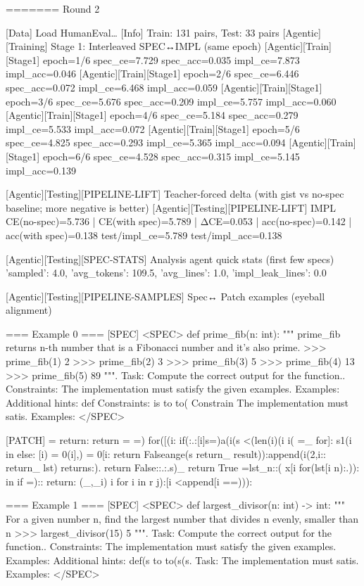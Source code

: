 =======
Round 2

[Data] Load HumanEval…
[Info] Train: 131 pairs, Test: 33 pairs
[Agentic][Training] Stage 1: Interleaved SPEC↔IMPL (same epoch)
[Agentic][Train][Stage1] epoch=1/6 spec_ce=7.729 spec_acc=0.035 impl_ce=7.873 impl_acc=0.046
[Agentic][Train][Stage1] epoch=2/6 spec_ce=6.446 spec_acc=0.072 impl_ce=6.468 impl_acc=0.059
[Agentic][Train][Stage1] epoch=3/6 spec_ce=5.676 spec_acc=0.209 impl_ce=5.757 impl_acc=0.060
[Agentic][Train][Stage1] epoch=4/6 spec_ce=5.184 spec_acc=0.279 impl_ce=5.533 impl_acc=0.072
[Agentic][Train][Stage1] epoch=5/6 spec_ce=4.825 spec_acc=0.293 impl_ce=5.365 impl_acc=0.094
[Agentic][Train][Stage1] epoch=6/6 spec_ce=4.528 spec_acc=0.315 impl_ce=5.145 impl_acc=0.139

[Agentic][Testing][PIPELINE-LIFT] Teacher-forced delta (with gist vs no-spec baseline; more negative is better)
[Agentic][Testing][PIPELINE-LIFT] IMPL CE(no-spec)=5.736 | CE(with spec)=5.789 | ΔCE=0.053 | acc(no-spec)=0.142 | acc(with spec)=0.138
test/impl_ce=5.789 test/impl_acc=0.138

[Agentic][Testing][SPEC-STATS] Analysis agent quick stats (first few specs)
{'sampled': 4.0, 'avg_tokens': 109.5, 'avg_lines': 1.0, 'impl_leak_lines': 0.0}

[Agentic][Testing][PIPELINE-SAMPLES] Spec↔ Patch examples (eyeball alignment)

=== Example 0 ===
[SPEC]
<SPEC> def prime_fib(n: int): """ prime_fib returns n-th number that is a Fibonacci number and it's also prime. >>> prime_fib(1) 2 >>> prime_fib(2) 3 >>> prime_fib(3) 5 >>> prime_fib(4) 13 >>> prime_fib(5) 89 """. Task: Compute the correct output for the function.. Constraints: The implementation must satisfy the given examples. Examples: Additional hints: def Constraints: is to to( Constrain The implementation must satis. Examples: </SPEC>

[PATCH]
= return: return = =) for([(i:  if(:.:[i]s=)a(i(s <(len(i)(i i( =_ for]: s1(i in else: [i) = 0(i],) = 0[i: return Falseange(s return_ result)):append(i(2,i:: return_ lst) returns:). return False::.:.s)_ return True =lst_n::( x[i for(lst[i n):.)): in if =):: return: (_,_i) i for i in r j):[i <append[i ==))):

=== Example 1 ===
[SPEC]
<SPEC> def largest_divisor(n: int) -> int: """ For a given number n, find the largest number that divides n evenly, smaller than n >>> largest_divisor(15) 5 """. Task: Compute the correct output for the function.. Constraints: The implementation must satisfy the given examples. Examples: Additional hints: def(s to to(s(s. Task: The implementation must satis. Examples: </SPEC>

